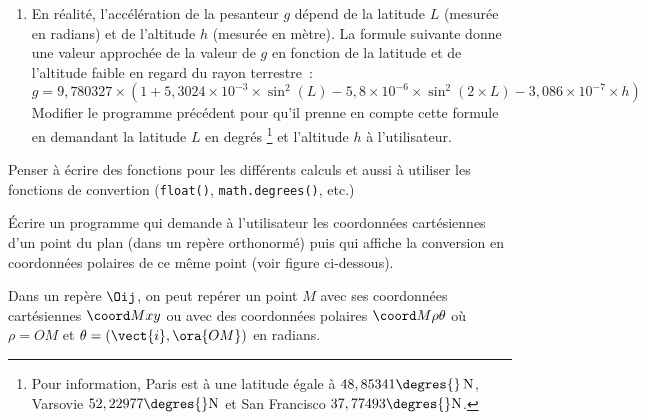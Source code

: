 {\begin{exercice}
\begin{enumerate}
 Écrire un programme qui demande à l'utilisateur les trois valeurs $x_0$, $v_0$ et $t$ et calcule
 la distance parcourue correspondante.
 \item En réalité, l'accélération de la pesanteur $g$ dépend de la latitude $L$ (mesurée en radians)
  et de l'altitude $h$ (mesurée en mètre). La formule suivante donne une valeur approchée de la valeur
   de $g$ en fonction de la latitude et de l'altitude faible en regard du rayon terrestre~:
\[ g=9,780327\times \left (1+5,3024\times10^{-3}\times\sin^2(L)-5,8\times10^{-6}\times \sin^2(2\times L)-3,086\times10^{-7}\times h\right )\]
Modifier le programme précédent pour qu'il prenne en compte cette formule en demandant la latitude
$L$ en degrés
\footnote{Pour information, Paris est à une latitude égale à $48,85341\degres{}\,\text{N}$,
Varsovie $52,22977\degres{}\text{N}$ et San Francisco $37,77493\degres{}\text{N}$.}
et l'altitude $h$ à l'utilisateur.
 \end{enumerate}
 Penser à écrire des fonctions pour les différents calculs et aussi à utiliser les fonctions de
 convertion (\texttt{float()}, \texttt{math.degrees()}, etc.)
 \end{exercice}

 \begin{exercice}
 Écrire un programme qui demande à l'utilisateur les coordonnées cartésiennes d'un point du plan
 (dans un repère orthonormé) puis qui affiche la conversion  en coordonnées polaires de ce même
 point (voir figure  ci-dessous).
\begin{multicols}{2}
\begin{center}%
\footnotesize
{}
\end{center}
\columnbreak
Dans un repère $\Oij$, on peut repérer un point $M$ avec ses coordonnées cartésiennes $\coord Mxy$
ou avec des coordonnées polaires $\coord M{\rho}{\theta}$ où $\rho=OM$ et
$\theta=\left(\vect{i}, \ora{OM}\right)$ en radians.



\end{multicols}
\end{exercice}}
